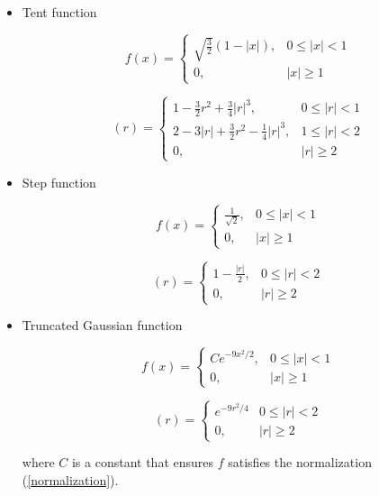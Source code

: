 \begin{itemize}
\item Tent function

\begin{equation}\label{ftent}
f(x) =
\begin{cases}
\sqrt{\frac{3}{2}}(1-|x|), & 0 \leq |x| < 1 \\
0, & |x| \geq 1
\end{cases}
\end{equation}

\begin{equation}
[f*f](r) = 
\begin{cases}
1-\frac{3}{2}r^2+\frac{3}{4}|r|^3, & 0 \leq |r| < 1 \\
2-3|r|+\frac{3}{2}r^2-\frac{1}{4}|r|^3, & 1 \leq |r| <2 \\
0, & |r|\geq 2
\end{cases}
\end{equation}

\item Step function

\begin{equation}\label{fstep}
f(x) =
\begin{cases}
\frac{1}{\sqrt{2}}, & 0 \leq |x| < 1 \\
0, & |x| \geq 1
\end{cases}
\end{equation}

\begin{equation}
[f*f](r) = 
\begin{cases}
1-\frac{|r|}{2}, & 0 \leq |r| < 2 \\
0, & |r|\geq 2
\end{cases}
\end{equation}

\item Truncated Gaussian function

\begin{equation}\label{fgaussian}
f(x) =
\begin{cases}
Ce^{-9x^2/2}, & 0 \leq |x| < 1 \\
0, & |x| \geq 1
\end{cases}
\end{equation}

\begin{equation}
[f*f](r) = 
\begin{cases}
e^{-9r^2/4} & 0\leq |r| < 2 \\
0, & |r|\geq 2
\end{cases}
\end{equation}

\noindent where $C$ is a constant that ensures $f$ satisfies the normalization (\ref{normalization}).

\end{itemize}


